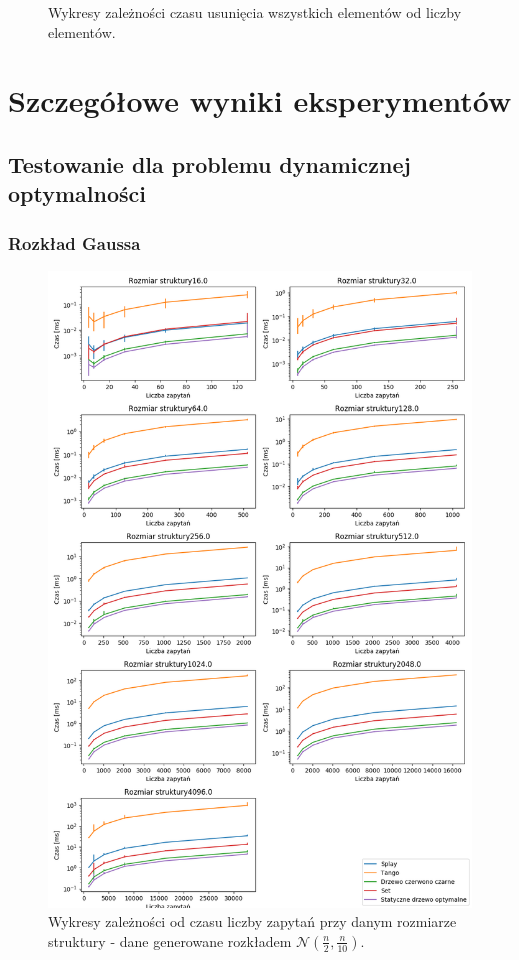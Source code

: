 \documentclass[declaration,shortabstract]{iithesis}
\theoremstyle{thm}
\theoremstyle{remark}
\theoremstyle{plain}
\theoremstyle{plain}
\theoremstyle{plain}
\begin{document}
\begin{figure}[ht]
\begin{minipage}[b]{.45\textwidth}
\caption{Wykresy zależności czasu usunięcia wszystkich elementów od liczby elementów. }
\end{minipage}
\end{figure}

\printbibliography

\appendix
\chapter{Szczegółowe wyniki eksperymentów}\label{app1}

\section{Testowanie dla problemu dynamicznej optymalności}
\subsection{Rozkład Gaussa}
\begin{figure}[H]  

\centering
    \includegraphics[scale=0.5]{wykresy/gaus01.png}
      \caption{Wykresy zależności od czasu liczby zapytań przy danym rozmiarze struktury - dane generowane rozkładem \(\mathcal{N}(\frac{n}{2}, \frac{n}{10})\). }  
    \label{fig:zigzig} 
\end{figure}
\end{document}
